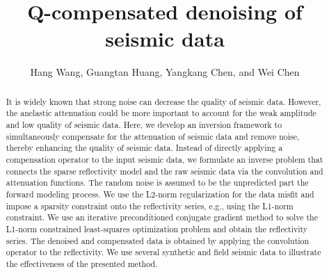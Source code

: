 \title{Q-compensated denoising of seismic data}
\renewcommand{\thefootnote}{\fnsymbol{footnote}}
\author{Hang Wang, Guangtan Huang, Yangkang Chen, and Wei Chen}
\maketitle




\begin{abstract}
It is widely known that strong noise can decrease the quality of seismic data. However, the anelastic attenuation could be more important to account for the weak amplitude and low quality of seismic data. Here, we develop an inversion framework to simultaneously compensate for the attenuation of seismic data and remove noise, thereby enhancing the quality of seismic data. Instead of directly applying a compensation operator to the input seismic data, we formulate an inverse problem that connects the sparse reflectivity model and the raw seismic data %
via the convolution and attenuation functions. The random noise is assumed to be the unpredicted part  the forward modeling process. We use the L2-norm regularization for the data misfit and impose a sparsity constraint onto the reflectivity series, e.g., using the L1-norm constraint. We use an iterative preconditioned conjugate gradient method to solve the L1-norm constrained least-squares optimization problem and obtain the  reflectivity series. The denoised and compensated data is obtained by applying the convolution operator to the reflectivity. We use several synthetic and field seismic data to illustrate the effectiveness of the presented method.
\end{abstract}


